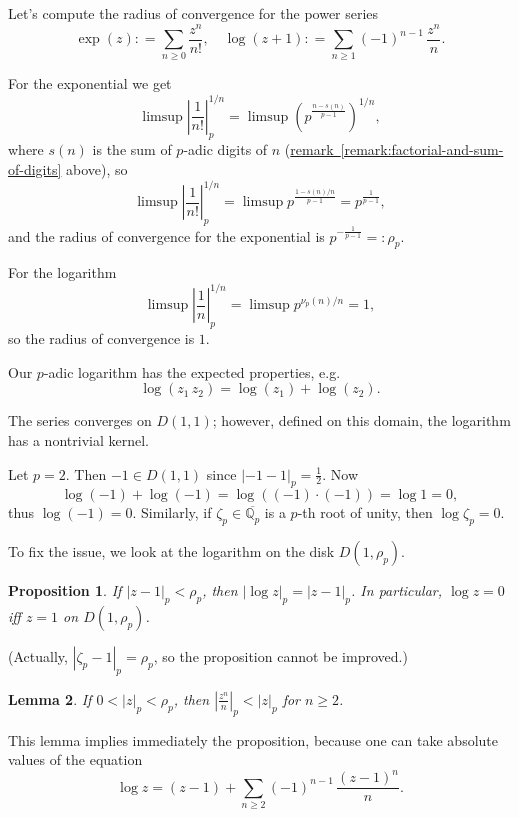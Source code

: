 \documentclass{article}
\newcommand{\dfn}{\mathrel{\mathop:}=}
\newcommand{\rdfn}{=\mathrel{\mathop:}}
\newcommand{\QQ}{\mathbb{Q}}
\newcommand{\refref}[2]{\hyperref[#2]{#1~\ref*{#2}}}
\newcommand{\examplesymbol}{$\blacktriangle$}
\renewcommand{\qedsymbol}{$\blacksquare$}
\theoremstyle{myplain}
\newtheorem{proposition}{Proposition}[section]
\newtheorem{lemma}[proposition]{Lemma}
\theoremstyle{mydefinition}
\newenvironment{example}
  {\pushQED{\qed}\renewcommand{\qedsymbol}{\examplesymbol}\examplex}
  {\popQED\endexamplex}
\begin{document}
\begin{example}
  Let's compute the radius of convergence for the power series
  \[ \exp (z) \dfn \sum_{n \ge 0} \frac{z^n}{n!}, \quad
    \log (z + 1) \dfn \sum_{n \ge 1} (-1)^{n-1} \, \frac{z^n}{n}. \]

  For the exponential we get
  \[ \limsup \left|\frac{1}{n!}\right|^{1/n}_p =
    \limsup \left(p^{\frac{n - s(n)}{p-1}}\right)^{1/n}, \]
  where $s (n)$ is the sum of $p$-adic digits of $n$
  (\refref{remark}{remark:factorial-and-sum-of-digits} above), so
  \[ \limsup \left|\frac{1}{n!}\right|^{1/n}_p =
    \limsup p^{\frac{1 - s(n)/n}{p-1}} = p^{\frac{1}{p-1}}, \]
  and the radius of convergence for the exponential is
  $p^{-\frac{1}{p-1}} \rdfn \rho_p$.

  \vspace{1em}

  For the logarithm
  $$\limsup \left|\frac{1}{n}\right|^{1/n}_p = \limsup p^{\nu_p (n)/n} = 1,$$
  so the radius of convergence is $1$.
\end{example}

Our $p$-adic logarithm has the expected properties, e.g.
$$\log (z_1\,z_2) = \log (z_1) + \log (z_2).$$

The series converges on $D (1,1)$; however, defined on this domain, the
logarithm has a nontrivial kernel.

\begin{example}
  Let $p = 2$. Then $-1 \in D (1,1)$ since $|-1-1|_p = \frac{1}{2}$. Now
  $$\log (-1) + \log (-1) = \log ((-1)\cdot(-1)) = \log 1 = 0,$$
  thus $\log (-1) = 0$. Similarly, if $\zeta_p \in \overline{\QQ_p}$ is a
  $p$-th root of unity, then $\log \zeta_p = 0$.
\end{example}

To fix the issue, we look at the logarithm on the disk $D (1, \rho_p)$.

\begin{proposition}
  If $|z-1|_p < \rho_p$, then $|\log z|_p = |z-1|_p$. In particular,
  $\log z = 0$ iff $z = 1$ on $D (1, \rho_p)$.
\end{proposition}

\noindent (Actually, $|\zeta_p - 1|_p = \rho_p$, so the proposition cannot be
improved.)

\begin{lemma}
  If $0 < |z|_p < \rho_p$, then $\left|\frac{z^n}{n}\right|_p < |z|_p$ for
  $n \ge 2$.
\end{lemma}

This lemma implies immediately the proposition, because one can take absolute
values of the equation
$$\log z = (z-1) + \sum_{n \ge 2} (-1)^{n-1} \, \frac{(z-1)^n}{n}.$$
\end{document}

